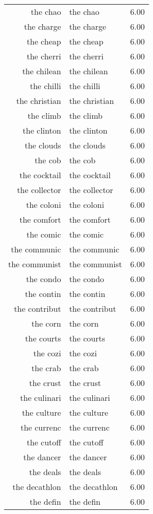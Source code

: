 \begin{table}[ht]
\begin{tabular}{rlr}
  the chao & the chao & 6.00 \\ 
  the charge & the charge & 6.00 \\ 
  the cheap & the cheap & 6.00 \\ 
  the cherri & the cherri & 6.00 \\ 
  the chilean & the chilean & 6.00 \\ 
  the chilli & the chilli & 6.00 \\ 
  the christian & the christian & 6.00 \\ 
  the climb & the climb & 6.00 \\ 
  the clinton & the clinton & 6.00 \\ 
  the clouds & the clouds & 6.00 \\ 
  the cob & the cob & 6.00 \\ 
  the cocktail & the cocktail & 6.00 \\ 
  the collector & the collector & 6.00 \\ 
  the coloni & the coloni & 6.00 \\ 
  the comfort & the comfort & 6.00 \\ 
  the comic & the comic & 6.00 \\ 
  the communic & the communic & 6.00 \\ 
  the communist & the communist & 6.00 \\ 
  the condo & the condo & 6.00 \\ 
  the contin & the contin & 6.00 \\ 
  the contribut & the contribut & 6.00 \\ 
  the corn & the corn & 6.00 \\ 
  the courts & the courts & 6.00 \\ 
  the cozi & the cozi & 6.00 \\ 
  the crab & the crab & 6.00 \\ 
  the crust & the crust & 6.00 \\ 
  the culinari & the culinari & 6.00 \\ 
  the culture & the culture & 6.00 \\ 
  the currenc & the currenc & 6.00 \\ 
  the cutoff & the cutoff & 6.00 \\ 
  the dancer & the dancer & 6.00 \\ 
  the deals & the deals & 6.00 \\ 
  the decathlon & the decathlon & 6.00 \\ 
  the defin & the defin & 6.00 \\ 

\end{tabular}
\end{table}
